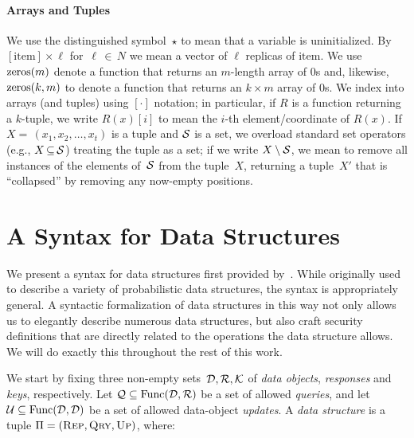 \paragraph{Arrays and Tuples}

We use the distinguished symbol~$\star$ to mean that a variable is uninitialized. By $[\text{item}] \times \ell$ for~$\ell \,{\in}\, N$ we mean a vector of $\ell$ replicas of $\text{item}$. We use $\mathrm{zeros}(m)$ denote a function that returns an $m$-length array of 0s and, likewise, $\mathrm{zeros}(k,m)$ to denote a function that returns an $k \times m$ array of 0s.  We index into arrays (and tuples) using $[\cdot]$ notation; in particular, if $R$ is a function returning a $k$-tuple, we write $R(x)[i]$ to mean the $i$-th element/coordinate of $R(x)$.  If~$X{=}\,(x_1,x_2,\ldots,x_t)$ is a tuple and $\mathcal{S}$ is a set, we overload standard set operators (e.g., $X \,{\subseteq}\, \mathcal{S}$) treating the tuple as a set; if we write $X \setminus \mathcal{S}$, we mean to remove all instances of the elements of~$\mathcal{S}$ from the tuple~$X$, returning a tuple~$X'$ that is ``collapsed'' by removing any now-empty positions.

\section{A Syntax for Data Structures}\label{subsec:syntax}

We present a syntax for data structures first provided by~\cite{clayton2019}. While originally used to describe a variety of probabilistic data structures, the syntax is appropriately general. A syntactic formalization of data structures in this way not only allows us to elegantly describe numerous data structures, but also craft security definitions that are directly related to the operations the data structure allows. We will do exactly this throughout the rest of this work.

We start by fixing three non-empty sets~$\mathcal{D},\mathcal{R},\mathcal{K}$ of \emph{data objects}, \emph{responses} and \emph{keys}, respectively.  Let $\mathcal{Q}\subseteq \mathrm{Func}(\mathcal{D},\mathcal{R})$ be a set of allowed \emph{queries}, and let $\mathcal{U} \subseteq \mathrm{Func}(\mathcal{D},\mathcal{D})$ be a set of allowed data-object \emph{updates}.  A {\em data structure} is a tuple $\Pi =
(\textnormal{\textsc{Rep}},\textnormal{\textsc{Qry}},\textnormal{\textsc{Up}})$, where:

